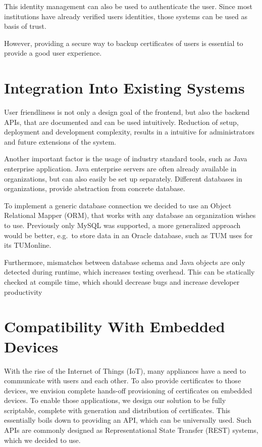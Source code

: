 This identity management can also be used to authenticate the user.
Since most institutions have already verified users identities, those systems can be used as basis of trust.

However, providing a secure way to backup certificates of users is essential to provide a good user experience.

\section{Integration Into Existing Systems}\label{sec:integrationIntoExistingSystems}
User friendliness is not only a design goal of the frontend, but also the backend APIs, that are documented and can be
used intuitively.
Reduction of setup, deployment and development complexity, results in a intuitive for administrators and future
extensions of the system.

Another important factor is the usage of industry standard tools, such as Java enterprise application.
Java enterprise servers are often already available in organizations, but can also easily be set up separately.
Different databases in organizations, provide abstraction from concrete database.

To implement a generic database connection we decided to use an Object Relational Mapper (ORM), that works with any
database an organization wishes to use.
Previously only MySQL was supported, a more generalized approach would be better, e.g.\ to store data in an Oracle
database, such as TUM uses for its TUMonline.

Furthermore, mismatches between database schema and Java objects are only detected during runtime, which increases
testing overhead.
This can be statically checked at compile time, which should decrease bugs and increase developer productivity

\section{Compatibility With Embedded Devices}\label{sec:compatibilityWithEmbeddedDevices}
With the rise of the Internet of Things (IoT), many appliances have a need to communicate with users and each other.
To also provide certificates to those devices, we envision complete hands-off provisioning of certificates on embedded
devices.
To enable those applications, we design our solution to be fully scriptable, complete with generation and distribution
of certificates.
This essentially boils down to providing an API, which can be universally used.
Such APIs are commonly designed as Representational State Transfer (REST) systems, which we decided to use.

